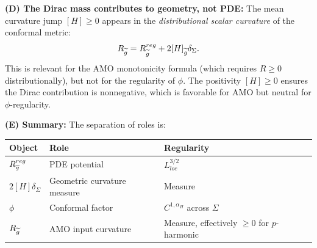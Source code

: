 \begin{remark}
\textbf{(D) The Dirac mass contributes to geometry, not PDE:}
The mean curvature jump $[H] \ge 0$ appears in the \emph{distributional scalar curvature} of the conformal metric:
\[
    R_{\widetilde{g}} = R_{\widetilde{g}}^{reg} + 2[H]_{\widetilde{g}} \delta_\Sigma.
\]
This is relevant for the AMO monotonicity formula (which requires $R \ge 0$ distributionally), but not for the regularity of $\phi$. The positivity $[H] \ge 0$ ensures the Dirac contribution is nonnegative, which is favorable for AMO but neutral for $\phi$-regularity.

\textbf{(E) Summary:}
The separation of roles is:
\begin{center}
\begin{tabular}{l|l|l}
\textbf{Object} & \textbf{Role} & \textbf{Regularity} \\
\hline
$R_{\overline{g}}^{reg}$ & PDE potential & $L^{3/2}_{loc}$ \\
$2[H]\delta_\Sigma$ & Geometric curvature measure & Measure \\
$\phi$ & Conformal factor & $C^{1,\alpha_H}$ across $\Sigma$ \\
$R_{\widetilde{g}}$ & AMO input curvature & Measure, effectively $\ge 0$ for $p$-harmonic
\end{tabular}
\end{center}
\end{remark}

